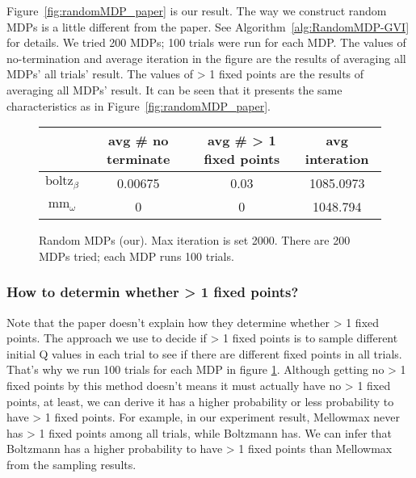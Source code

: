 Figure\ \ref{fig:randomMDP_paper} is our result.
The way we construct random MDPs is a little different from the paper. 
See Algorithm\ \ref{alg:RandomMDP-GVI} for details. We tried 200 MDPs; 100 trials were run for each MDP. 
The values of no-termination and average iteration in the figure are the results of averaging all MDPs' all trials' result.
The values of > 1 fixed points are the results of averaging all MDPs' result.
It can be seen that it presents the same characteristics as in Figure\ \ref{fig:randomMDP_paper}.

\begin{figure}[H]
    \centering
    \begin{tabular}{ |c|c|c|c| } 
     \hline
     { }  & avg \# no terminate & avg \# > 1 fixed points & avg interation\\ 
     \hline
     $\text{boltz}_\beta$ & 0.00675 & 0.03 & 1085.0973\\ 
     \hline
     $\text{mm}_\omega$ & 0 & 0 & 1048.794 \\ 
     \hline
    \end{tabular}
    \caption{Random MDPs (our). Max iteration is set 2000. There are 200 MDPs tried; each MDP runs 100 trials.}\label{fig:randomMDP_our}
\end{figure}


\subsubsection{How to determin whether > 1 fixed points?}
{Note that the paper doesn't explain how they determine whether > 1 fixed points. 
The approach we use to decide if > 1 fixed points is to sample different initial Q values 
in each trial to see if there are different fixed points in all trials. 
That's why we run 100 trials for each MDP in figure \ref{fig:randomMDP_our}. 
Although getting no > 1 fixed points by this method doesn't means it must actually have no > 1 fixed points, 
at least, we can derive it has a higher probability or less probability to have > 1 fixed points. 
For example, in our experiment result, Mellowmax never has > 1 fixed points among all trials, 
while Boltzmann has. We can infer that Boltzmann has a higher probability to have > 1 fixed points than Mellowmax from the sampling results.
}\label{randomMDP_finding_fixed_points_issue}



